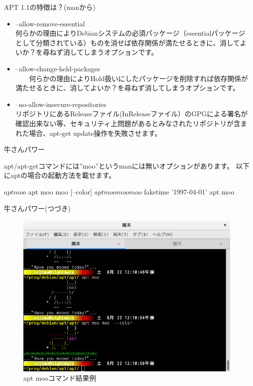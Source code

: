 \begin{frame}{APT 1.1の特徴は？(manから)}

\begin{itemize}
 \item --allow-remove-essential \\
   何らかの理由によりDebianシステムの必須パッケージ（essentialパッケージとして分類されている）ものを消せば依存関係が満たせるときに、消してよいか？を尋ねず消してしまうオプションです。
 \item --allow-change-held-packages \\
　　何らかの理由によりHold扱いにしたパッケージを削除すれば依存関係が満たせるときに、消してよいか？を尋ねず消してしまうオプションです。
　\item --no-allow-insecure-repositories \\
   リポジトリにあるReleaseファイル(InReleaseファイル）のGPGによる署名が確認出来ない等、セキュリティ上問題があるとみなされたリポジトリが含まれた場合、apt-get update操作を失敗させます。
\end{itemize}

\end{frame}

\begin{frame}[containsverbatim]{牛さんパワー}

  apt/apt-getコマンドには''moo''というmanには無いオプションがあります。
以下にaptの場合の起動方法を載せます。
\begin{commandlinesmall}  
$ apt moo 
$ apt moo moo [--color]
$ apt moo moo moo  
$ faketime '1997-04-01' apt moo
\end{commandlinesmall}    
  
\end{frame}

\begin{frame}{牛さんパワー(つづき)}

\begin{figure}[H]
\begin{center}
 \includegraphics[width=1.0\hsize]{image201508/apt-moo.png}
\end{center}
\caption{apt mooコマンド結果例}
\end{figure}

\end{frame}


